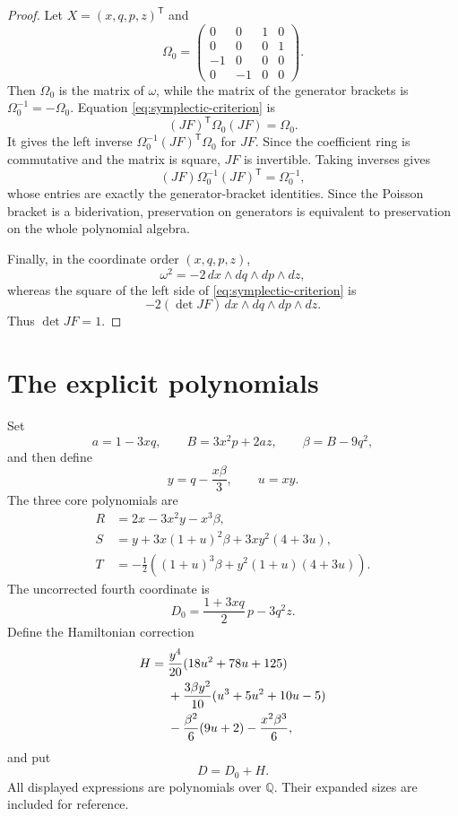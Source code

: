 \documentclass[11pt]{article}
\newcommand{\Q}{\mathbb Q}
\theoremstyle{remark}
\begin{document}
\begin{proof}
Let \(X=(x,q,p,z)^{\mathsf T}\) and
\[
  \Omega_0=
  \begin{pmatrix}
    0&0&1&0\\
    0&0&0&1\\
    -1&0&0&0\\
    0&-1&0&0
  \end{pmatrix}.
\]
Then \(\Omega_0\) is the matrix of \(\omega\), while the matrix of the generator
brackets is \(\Omega_0^{-1}=-\Omega_0\).  Equation
\eqref{eq:symplectic-criterion} is
\[
  (JF)^{\mathsf T}\Omega_0(JF)=\Omega_0.
\]
It gives the left inverse \(\Omega_0^{-1}(JF)^{\mathsf T}\Omega_0\) for \(JF\).
Since the coefficient ring is commutative and the matrix is square, \(JF\) is
invertible.  Taking inverses gives
\[
  (JF)\Omega_0^{-1}(JF)^{\mathsf T}=\Omega_0^{-1},
\]
whose entries are exactly the generator-bracket identities.  Since the
Poisson bracket is a biderivation, preservation on generators is equivalent
to preservation on the whole polynomial algebra.

Finally, in the coordinate order \((x,q,p,z)\),
\[
  \omega^2=-2\,dx\wedge dq\wedge dp\wedge dz,
\]
whereas the square of the left side of
\eqref{eq:symplectic-criterion} is
\[
  -2(\det JF)\,dx\wedge dq\wedge dp\wedge dz.
\]
Thus \(\det JF=1\).
\end{proof}

\section{The explicit polynomials}\label{sec:construction}

Set
\begin{equation}\label{eq:a-B-beta}
  a=1-3xq,
  \qquad
  B=3x^2p+2az,
  \qquad
  \beta=B-9q^2,
\end{equation}
and then define
\begin{equation}\label{eq:y-u}
  y=q-\frac{x\beta}{3},
  \qquad
  u=xy.
\end{equation}
The three core polynomials are
\begin{align}
  R&=2x-3x^2y-x^3\beta,\label{eq:R-def}\\
  S&=y+3x(1+u)^2\beta+3xy^2(4+3u),\label{eq:S-def}\\
  T&=-\frac12\left((1+u)^3\beta
      +y^2(1+u)(4+3u)\right).\label{eq:T-def}
\end{align}
The uncorrected fourth coordinate is
\begin{equation}\label{eq:D0-def}
  D_0=\frac{1+3xq}{2}\,p-3q^2z.
\end{equation}
Define the Hamiltonian correction
\begin{align}
  H={}&\frac{y^4}{20}(18u^2+78u+125)\notag\\
     &+\frac{3\beta y^2}{10}(u^3+5u^2+10u-5)\notag\\
     &-\frac{\beta^2}{6}(9u+2)-\frac{x^2\beta^3}{6},
     \label{eq:H-def}
\end{align}
and put
\begin{equation}\label{eq:D-def}
  D=D_0+H.
\end{equation}
All displayed expressions are polynomials over \(\Q\).  Their expanded sizes
are included for reference.
\end{document}
